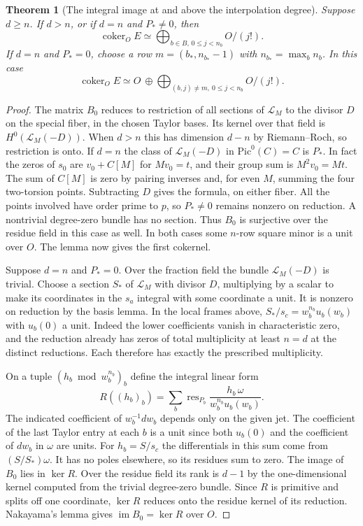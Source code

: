 \documentclass[a4paper,11pt]{article}
\newtheorem{theorem}[proposition]{Theorem}
\theoremstyle{definition}
\theoremstyle{remark}
\numberwithin{equation}{section}
\begin{document}
\begin{theorem}[The integral image at and above the interpolation degree]\leavevmode
\label{thm:jetsmith485}
Suppose \(d\ge n\). If \(d>n\), or if \(d=n\) and
\(P_*\ne0\), then
\[
             \operatorname{coker}_O E
                \simeq\bigoplus_{b\in B,\,0\le j<n_b} O/(j!).
\]
If \(d=n\) and \(P_*=0\), choose a row \(m=(b_*,n_{b_*}-1)\)
with \(n_{b_*}=\max_b n_b\). In this case
\[
             \operatorname{coker}_O E
                \simeq O\ \oplus
                   \bigoplus_{(b,j)\ne m,\ 0\le j<n_b}O/(j!).
\]
\end{theorem}
\begin{proof}
The matrix \(B_0\) reduces to restriction of all sections of
\(\mathcal L_M\) to the divisor \(D\) on the special fiber,
in the chosen Taylor bases. Its kernel over that field is
\(H^0(\mathcal L_M(-D))\). When \(d>n\) this has dimension
\(d-n\) by Riemann--Roch, so restriction is onto. If \(d=n\)
the class of \(\mathcal L_M(-D)\) in \(\mathrm{Pic}^0(C)=C\)
is \(P_*\). In fact the zeros of \(s_0\) are \(v_0+C[M]\) for
\(Mv_0=t\), and their group sum is \(M^2v_0=Mt\).
The sum of \(C[M]\) is zero by pairing inverses and, for even
\(M\), summing the four two-torsion points. Subtracting \(D\)
gives the formula, on either fiber. All the points involved have
order prime to \(p\), so \(P_*\ne0\) remains nonzero on reduction.
A nontrivial degree-zero bundle has no section. Thus \(B_0\)
is surjective over the residue field in this case as well.
In both cases some \(n\)-row square minor is a unit over \(O\).
The lemma now gives the first cokernel.

Suppose \(d=n\) and \(P_*=0\). Over the fraction field the
bundle \(\mathcal L_M(-D)\) is trivial. Choose a section
\(S_*\) of \(\mathcal L_M\) with divisor \(D\), multiplying by
a scalar to make its coordinates in the \(s_a\) integral with
some coordinate a unit. It is nonzero on reduction by the basis
lemma. In the local frames above,
\(S_*/s_c=w_b^{n_b}u_b(w_b)\) with \(u_b(0)\) a unit.
Indeed the lower coefficients vanish in characteristic zero,
and the reduction already has zeros of total multiplicity
at least \(n=d\) at the distinct reductions. Each therefore
has exactly the prescribed multiplicity.

On a tuple \((h_b\bmod w_b^{n_b})_b\) define the integral
linear form
\[
       R((h_b)_b)=
           \sum_b\operatorname{res}_{P_b}
                     \frac{h_b\,\omega}{w_b^{n_b}u_b(w_b)} .
\]
The indicated coefficient of \(w_b^{-1}dw_b\) depends only
on the given jet. The coefficient of the last Taylor entry at
each \(b\) is a unit since both \(u_b(0)\) and the coefficient
of \(dw_b\) in \(\omega\) are units. For \(h_b=S/s_c\) the
differentials in this sum come from \((S/S_*)\omega\). It has
no poles elsewhere, so its residues sum to zero. The image of
\(B_0\) lies in \(\ker R\). Over the residue field its rank is
\(d-1\) by the one-dimensional kernel computed from the trivial
degree-zero bundle. Since \(R\) is primitive and splits off one
coordinate, \(\ker R\) reduces onto the residue kernel of its
reduction. Nakayama's lemma gives
\(\operatorname{im}B_0=\ker R\) over \(O\).


\end{proof}
\end{document}
